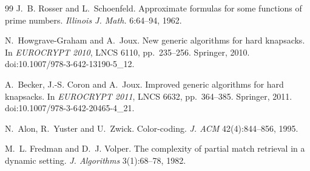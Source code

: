 \documentclass[11pt]{article}
\theoremstyle{plain}
\begin{document}
\begin{thebibliography}{99}
J.~B. Rosser and L.~Schoenfeld. Approximate formulas for some functions of prime numbers. \emph{Illinois J. Math.} 6:64--94, 1962.

N.~Howgrave-Graham and A.~Joux. New generic algorithms for hard knapsacks. In \emph{EUROCRYPT 2010}, LNCS 6110, pp.~235--256. Springer, 2010. doi:10.1007/978-3-642-13190-5\_12.

A.~Becker, J.-S. Coron and A.~Joux. Improved generic algorithms for hard knapsacks. In \emph{EUROCRYPT 2011}, LNCS 6632, pp.~364--385. Springer, 2011. doi:10.1007/978-3-642-20465-4\_21.

N.~Alon, R.~Yuster and U.~Zwick. Color-coding. \emph{J. ACM} 42(4):844--856, 1995.

M.~L. Fredman and D.~J. Volper. The complexity of partial match retrieval in a dynamic setting. \emph{J. Algorithms} 3(1):68--78, 1982.

\end{thebibliography}
\end{document}
